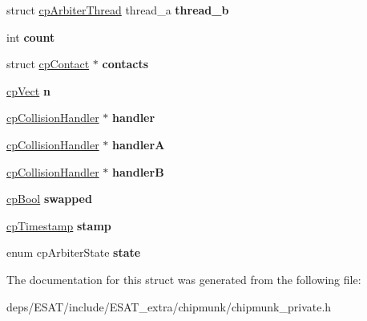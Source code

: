 \begin{DoxyCompactItemize}
\item 
\mbox{\label{structcp_arbiter_a33883f0931febf9b4111c0f795834b4f}} 
struct \mbox{\hyperlink{structcp_arbiter_thread}{cp\+Arbiter\+Thread}} thread\+\_\+a {\bfseries thread\+\_\+b}
\item 
\mbox{\label{structcp_arbiter_a7dfee6fde35d7bb551ee24fcbbe49018}} 
int {\bfseries count}
\item 
\mbox{\label{structcp_arbiter_a4654107db135771ba090750bbadec376}} 
struct \mbox{\hyperlink{structcp_contact}{cp\+Contact}} $\ast$ {\bfseries contacts}
\item 
\mbox{\label{structcp_arbiter_a74be8aab017a21f5a2ff1dd1a233a3b3}} 
\mbox{\hyperlink{structcp_vect}{cp\+Vect}} {\bfseries n}
\item 
\mbox{\label{structcp_arbiter_a0bf89f22d68c4892b26702b4d8a1ee04}} 
\mbox{\hyperlink{structcp_collision_handler}{cp\+Collision\+Handler}} $\ast$ {\bfseries handler}
\item 
\mbox{\label{structcp_arbiter_aa089aee327ce057cbbd7868403a929e4}} 
\mbox{\hyperlink{structcp_collision_handler}{cp\+Collision\+Handler}} $\ast$ {\bfseries handlerA}
\item 
\mbox{\label{structcp_arbiter_aa983a7ae64a50b5ca095a47605379e4a}} 
\mbox{\hyperlink{structcp_collision_handler}{cp\+Collision\+Handler}} $\ast$ {\bfseries handlerB}
\item 
\mbox{\label{structcp_arbiter_a05eb6f37d1e8b27dcfbccd79d5773495}} 
\mbox{\hyperlink{group__basic_types_gabc5e752c48f3449ca26ef413ecbd647e}{cp\+Bool}} {\bfseries swapped}
\item 
\mbox{\label{structcp_arbiter_a7c724b956f3d7b91f6aa1d73d886b56c}} 
\mbox{\hyperlink{group__basic_types_gaa24652c104082d0725066ea5ac7dc83f}{cp\+Timestamp}} {\bfseries stamp}
\item 
\mbox{\label{structcp_arbiter_a972953b321f437fbc5000539cc7e3b1e}} 
enum cp\+Arbiter\+State {\bfseries state}
\end{DoxyCompactItemize}


The documentation for this struct was generated from the following file\+:\begin{DoxyCompactItemize}
\item 
deps/\+E\+S\+A\+T/include/\+E\+S\+A\+T\+\_\+extra/chipmunk/chipmunk\+\_\+private.\+h\end{DoxyCompactItemize}
